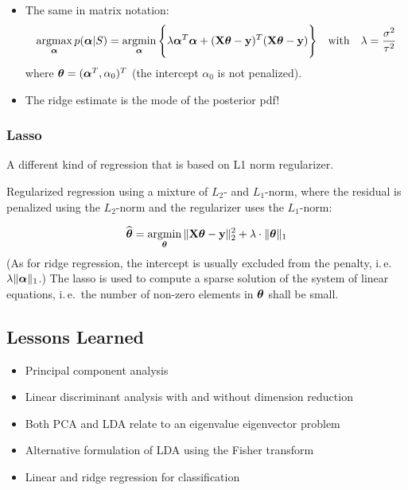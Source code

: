 \begin{itemize}
\begin{eqnarray*}
			      &=& \argmin_{\vect{\alpha}} \Bigg\{ \frac{\sigma^2}{\tau^2} \sum_{j=1}^d \alpha_j^2 + \sum_{i=1}^m (y_i - \vect{\alpha}^T \vect{x}_i - \alpha_0)^2 \Bigg\}
		      \end{eqnarray*}
    		\item {The same in matrix notation:} 
		      {\footnotesize
		      \begin{displaymath}
			      \operatorname*{argmax}_{\bm{\mathrm{\alpha}}} p(\bm{\mathrm{\alpha}}|S)
			      = \operatorname*{argmin}_{\bm{\mathrm{\alpha}}} \Bigg\{ \lambda \bm{\mathrm{\alpha}}^T \bm{\mathrm{\alpha}} + (\mathbf{X}\bm{\mathrm{\theta}} - \bm{\mathrm{y}})^T (\mathbf{X}\bm{\mathrm{\theta}} - \bm{\mathrm{y}}) \Bigg\}
			      \quad \text{with} \quad
			      \lambda = \frac{\sigma^2}{\tau^2}
		      \end{displaymath}
		      where $\bm{\mathrm{\theta}} = (\bm{\mathrm{\alpha}}^T, \alpha_0)^T$ (the intercept $\alpha_0$ is not penalized).
		      }
		\item {The ridge estimate is the mode of the posterior pdf!}
	\end{itemize}

\subsubsection{Lasso}

A different kind of regression that is based on L1 norm regularizer. 

	Regularized regression using a mixture of $L_2$- and $L_1$-norm, where the residual is penalized using the $L_2$-norm and the regularizer uses the $L_1$-norm:

	\begin{displaymath}
		\widehat{\bm{\mathrm{\theta}}} = \operatorname*{argmin}_{\bm{\mathrm{\theta}}} \|\mathbf{X}\bm{\mathrm{\theta}}-\bm{\mathrm{y}}\|^2_2 + \lambda \cdot \|\bm{\mathrm{\theta}}\|_1
	\end{displaymath}
	(As for ridge regression, the intercept is usually excluded from the penalty, i.\,e.\ $\lambda\|\bm{\mathrm{\alpha}}\|_1$.)
	The lasso is used to compute a sparse solution of the system of linear equations, i.\,e.\ the number of non-zero elements in $\bm{\mathrm{\theta}}$ shall be small.
	
\subsection{Lessons Learned}

	\begin{itemize}
		\item Principal component analysis 
		\item Linear discriminant analysis with and without dimension reduction 
		\item Both PCA and LDA relate to an eigenvalue eigenvector problem 
		\item Alternative formulation of LDA using the Fisher transform 
		\item Linear and ridge regression for classification
	\end{itemize}
	
